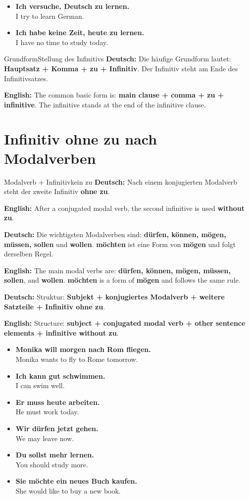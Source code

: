 \documentclass[a4paper,11pt]{article}
\newcommand{\GermanText}[1]{\textbf{Deutsch: }#1\par}
\newcommand{\EnglishText}[1]{{\small\color{SoftGray}\textbf{English: }#1\par}}
\newcommand{\ExampleItem}[2]{\item \textbf{#1}\\{\small\color{SoftGray}#2}}
\begin{document}
        \begin{exbox}
            \begin{itemize}
                \ExampleItem{Ich versuche, Deutsch zu lernen.}{I try to learn German.}
                \ExampleItem{Ich habe keine Zeit, heute zu lernen.}{I have no time to study today.}
            \end{itemize}
        \end{exbox}

        \begin{grammarentry}{Grundform}{Stellung des Infinitivs}
            \GermanText{Die häufige Grundform lautet: \textbf{Hauptsatz + Komma + zu + Infinitiv}. Der Infinitiv steht am Ende des Infinitivsatzes.}
            \EnglishText{The common basic form is: \textbf{main clause + comma + zu + infinitive}. The infinitive stands at the end of the infinitive clause.}
        \end{grammarentry}


    \section{Infinitiv ohne \glqq zu\grqq{} nach Modalverben}

        \begin{grammarentry}{Modalverb + Infinitiv}{kein zu}
            \GermanText{Nach einem konjugierten Modalverb steht der zweite Infinitiv \textbf{ohne zu}.}
            \EnglishText{After a conjugated modal verb, the second infinitive is used \textbf{without zu}.}

            \GermanText{Die wichtigsten Modalverben sind: \textbf{dürfen, können, mögen, müssen, sollen} und \textbf{wollen}. \textbf{möchten} ist eine Form von \textbf{mögen} und folgt derselben Regel.}
            \EnglishText{The main modal verbs are: \textbf{dürfen, können, mögen, müssen, sollen}, and \textbf{wollen}. \textbf{möchten} is a form of \textbf{mögen} and follows the same rule.}

            \GermanText{Struktur: \textbf{Subjekt + konjugiertes Modalverb + weitere Satzteile + Infinitiv ohne zu}.}
            \EnglishText{Structure: \textbf{subject + conjugated modal verb + other sentence elements + infinitive without zu}.}
        \end{grammarentry}

        \begin{exbox}
            \begin{itemize}
                \ExampleItem{Monika will morgen nach Rom fliegen.}{Monika wants to fly to Rome tomorrow.}
                \ExampleItem{Ich kann gut schwimmen.}{I can swim well.}
                \ExampleItem{Er muss heute arbeiten.}{He must work today.}
                \ExampleItem{Wir dürfen jetzt gehen.}{We may leave now.}
                \ExampleItem{Du sollst mehr lernen.}{You should study more.}
                \ExampleItem{Sie möchte ein neues Buch kaufen.}{She would like to buy a new book.}
            \end{itemize}
        \end{exbox}
\end{document}
